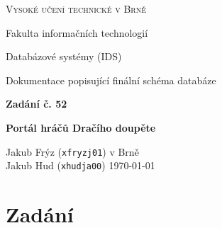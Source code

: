 \documentclass[a4paper, 11pt]{article}
\begin{document}
\begin{titlepage}
	
	\begin{center}
	
	\begin{huge}
		
		\textsc{Vysoké učení technické v Brně}
		
		Fakulta informačních technologií
		
	\end{huge}
	
	
	\begin{LARGE}
		
		Databázové systémy (IDS)
		
		Dokumentace popisující finální schéma databáze
		
		\bigskip
		
		\textbf{Zadání č. 52}
		
		\textbf{Portál hráčů Dračího doupěte}
		
	\end{LARGE}

	\end{center}
	
	
	\begin{large}
		

		\noindent Jakub Frýz (\texttt{xfryzj01}) \hfill v Brně \\ Jakub Hud (\texttt{xhudja00}) \hfill \today
		
	\end{large}
	
\end{titlepage}

\tableofcontents

\pagebreak

\section{Zadání}
\end{document}
